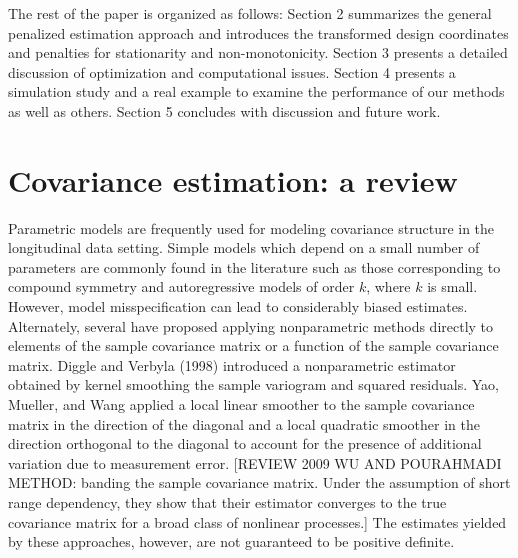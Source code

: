 \documentclass[12pt]{article}
\newcommand*\needsparaphrased{\color{red}}
\begin{document}
The rest of the paper is organized as follows: Section 2 summarizes the general penalized estimation approach and introduces the transformed design coordinates and penalties for stationarity and non-monotonicity. Section 3 presents a detailed discussion of optimization and computational issues. Section 4 presents a simulation study and a real example to examine the performance of our methods as well as others. Section 5 concludes with discussion and future work.	

\section{Covariance estimation: a review}

Parametric models are frequently used for modeling covariance structure in the longitudinal data setting. Simple models which depend on a small number of parameters  are commonly found in the literature such as those corresponding to compound symmetry and autoregressive models of order $k$, where $k$ is small. However, model misspecification can lead to considerably biased estimates. Alternately, several have proposed applying nonparametric methods directly to elements of the sample covariance matrix or a function of the sample covariance matrix. Diggle and Verbyla (1998) introduced a nonparametric estimator obtained by kernel smoothing the sample variogram and squared residuals.  Yao, Mueller, and Wang applied a local linear smoother to the sample covariance matrix in the direction of the diagonal and a local quadratic smoother in the direction orthogonal to the diagonal to account for the presence of additional variation due to measurement error.  {\needsparaphrased[REVIEW 2009 WU AND POURAHMADI  METHOD: banding the sample covariance matrix. Under the assumption of short range dependency, they show that their estimator converges to the true covariance matrix for a broad class of nonlinear processes.]} The estimates yielded by these approaches, however, are not guaranteed to be positive definite. 
\end{document}
